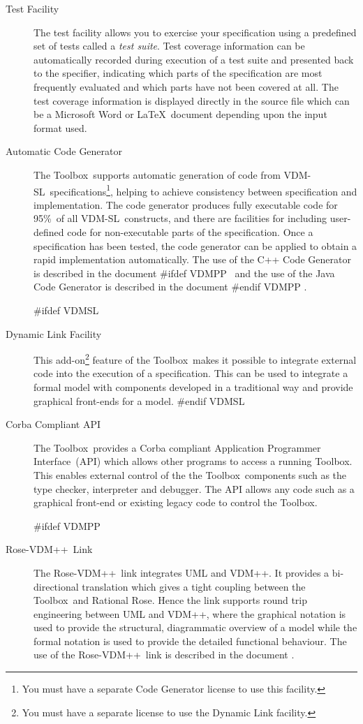 \documentclass[\pformat,12pt]{article}
\def\vdmpp{{\small VDM}++}
\newcommand{\vdmslpp}{VDM-SL}
\newcommand{\Toolbox}{Toolbox}
\newcommand{\vdmslpp}{VDM++}
\newcommand{\Toolbox}{Toolbox}
\begin{document}
\begin{description}
\item[Test Facility] The test facility allows you to exercise your
  specification using a predefined set of tests called a {\em test
    suite\/}. Test coverage information can be automatically recorded
  during execution of a test suite and presented back to the
  specifier, indicating which parts of the specification are most
  frequently evaluated and which parts have not been covered at all.
  The test coverage information is displayed directly in the source
  file which can be a Microsoft Word or \LaTeX\ document depending
  upon the input format used.

\item[Automatic Code Generator] The \Toolbox\ supports automatic
  generation of  code
  from \vdmslpp\ specifications\footnote{You must have a separate Code
    Generator license to use this facility.}, helping to achieve
  consistency between specification and implementation. The code
  generator produces fully executable code for 95\%\ of all \vdmslpp\
  constructs, and there are facilities for including user-defined code
  for non-executable parts of the specification.  Once a specification
  has been tested, the code generator can be applied to obtain a rapid
  implementation automatically. The use of the C++ Code Generator is
  described in the document
#ifdef VDMPP
\ and the use of the Java Code Generator is described in the document
\cite{CGJavaManPP-CSK}%
#endif VDMPP
.

#ifdef VDMSL
\item[Dynamic Link Facility] This add-on\footnote{You must have a
    separate license to use the Dynamic Link facility.} feature of the
  \Toolbox\ makes it possible to integrate external code into the
  execution of a specification.  This can be used to integrate a
  formal model with components developed in a traditional way and
  provide graphical front-ends for a model.  
#endif VDMSL

\item[Corba Compliant API] The \Toolbox\ provides a Corba compliant
  Application Programmer Interface~(API) which allows other programs
  to access a running \Toolbox. This enables external control of the
  the \Toolbox\ components such as the type checker, interpreter and
  debugger. The API allows any code such as a graphical front-end or
  existing legacy code to control the \Toolbox.

#ifdef VDMPP
\item[Rose-\vdmpp\ Link] The Rose-\vdmpp\ link integrates UML and
  \vdmpp.  It provides a bi-directional translation which gives a
  tight coupling between the \Toolbox\ and Rational Rose. Hence the
  link supports round trip engineering between UML and \vdmpp, where
  the graphical notation is used to provide the structural,
  diagrammatic overview of a model while the formal notation is used
  to provide the detailed functional behaviour. The use of
  the Rose-\vdmpp\ link is described in the document \cite{UMLMan-CSK}.


\end{description}
\end{document}
